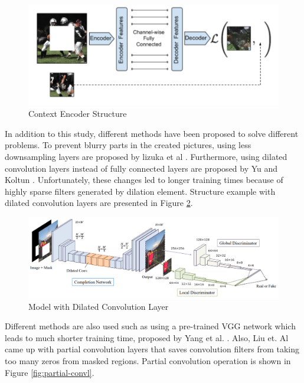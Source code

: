 \begin{figure}[h]
    \centering
    \includegraphics[scale=0.5]{figures/chapter4/context-encoder-example.png}
    \caption{Context Encoder Structure}
    \label{fig:context-encoder}
\end{figure}

In addition to this study, different methods have been proposed to solve different problems. To prevent blurry parts in the created pictures, using less downsampling layers are proposed by lizuka et al \cite{Iizuka2017}. Furthermore, using dilated convolution layers instead of fully connected layers are proposed by Yu and Koltun \cite{dilated_conv}. Unfortunately, these changes led to longer training times because of highly sparse filters generated by dilation element. Structure example with dilated convolution layers are presented in Figure \ref{fig:dilated-model}.

\begin{figure}[h]
    \centering
    \includegraphics[scale=0.35]{figures/chapter4/Lizukaetal.PNG}
    \caption{Model with Dilated Convolution Layer}
    \label{fig:dilated-model}
\end{figure}

Different methods are also used such as using a pre-trained VGG network which leads to much shorter training time, proposed by Yang et al. \cite{inpainting_neuralpatch}. Also, Liu et. Al \cite{richer_conv_edge} came up with partial convolution layers that saves convolution filters from taking too many zeros from masked regions. Partial convolution operation is shown in Figure \ref{fig:partial-convl}.

